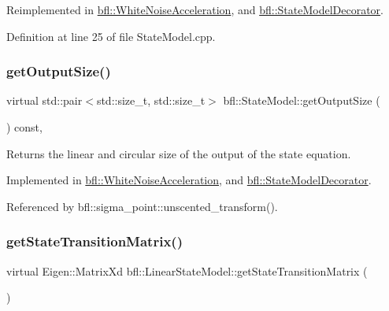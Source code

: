 Reimplemented in \mbox{\hyperlink{classbfl_1_1WhiteNoiseAcceleration_a819bd0d5510c9863272b422ab33b7adc}{bfl\+::\+White\+Noise\+Acceleration}}, and \mbox{\hyperlink{classbfl_1_1StateModelDecorator_a6825b807be82c66feb8bbb62d240490b}{bfl\+::\+State\+Model\+Decorator}}.



Definition at line 25 of file State\+Model.\+cpp.

\mbox{\label{classbfl_1_1StateModel_a6bf680b689389d959fc9ac46595e6dab}} 
\subsubsection{\texorpdfstring{get\+Output\+Size()}{getOutputSize()}}
{\footnotesize\ttfamily virtual std\+::pair$<$std\+::size\+\_\+t, std\+::size\+\_\+t$>$ bfl\+::\+State\+Model\+::get\+Output\+Size (\begin{DoxyParamCaption}{ }\end{DoxyParamCaption}) const\hspace{0.3cm}{\ttfamily [pure virtual]}, {\ttfamily [inherited]}}



Returns the linear and circular size of the output of the state equation. 



Implemented in \mbox{\hyperlink{classbfl_1_1WhiteNoiseAcceleration_ac3e447bf2f520b543c67d066f72423b7}{bfl\+::\+White\+Noise\+Acceleration}}, and \mbox{\hyperlink{classbfl_1_1StateModelDecorator_a2b2f00e6825e382587a2edbbba4569de}{bfl\+::\+State\+Model\+Decorator}}.



Referenced by bfl\+::sigma\+\_\+point\+::unscented\+\_\+transform().

\mbox{\label{classbfl_1_1LinearStateModel_a58db2093c6d255b8d41dbf0f0c5c28e5}} 
\subsubsection{\texorpdfstring{get\+State\+Transition\+Matrix()}{getStateTransitionMatrix()}}
{\footnotesize\ttfamily virtual Eigen\+::\+Matrix\+Xd bfl\+::\+Linear\+State\+Model\+::get\+State\+Transition\+Matrix (\begin{DoxyParamCaption}{ }\end{DoxyParamCaption})\hspace{0.3cm}{\ttfamily [pure virtual]}}



